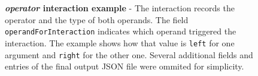 \begin{figure}[h]
	\centering
	\begin{lrbox}{\mintedbox}
		\begin{minipage}{0.34\textwidth}
		\end{minipage}
	\end{lrbox}
	\hfill
	\begin{lrbox}{\mintedbox}
		\begin{minipage}{0.62\textwidth}
		\end{minipage}
	\end{lrbox}
	\caption[\textit{operator} interaction example]{\textbf{\textit{operator} interaction example} - The interaction records the operator and the type of both operands. The field \texttt{operandForInteraction} indicates which operand triggered the interaction. The example shows how that value is \texttt{left} for one argument and \texttt{right} for the other one. Several additional fields and entries of the final output JSON file were ommited for simplicity.}
	\label{fig:run-time-information-gathering-following-interactions}
\end{figure}